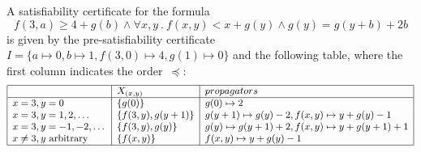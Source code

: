 \documentclass[runningheads]{llncs}
\begin{document}
\begin{example}\label{ex:certificate-example}
A satisfiability certificate for the formula \[f(3, a) \geq 4 + g(b) \wedge \forall x, y \:.\: f(x, y) < x + g(y) \wedge g(y) = g(y+b) + 2b\] is 
given by the pre-satisfiability certificate $I = \{ a \mapsto 0, b \mapsto 1, f(3,0) \mapsto 4, g(1) \mapsto 0 \}$ and the following table, where the first column indicates the order~$\preceq$:
    \[\small
    \begin{array}{|l|l|l|l|}\hline
      & X_{(x,y)} & propagators\\ \hline
        x=3, y=0  & \{g(0)\} & g(0)\mapsto 2\\
        x=3,y=1,2,\dots & \{f(3,y), g(y+1)\} & g(y+1)\mapsto g(y)-2, f(x,y)\mapsto y+g(y)-1\\
        x=3, y=-1,-2,\dots &  \{f(3,y), g(y)\} & g(y)\mapsto g(y+1)+2, f(x,y)\mapsto y+g(y+1)+1 \\
       x\neq 3, y \text{ arbitrary}  &   \{f(x,y) \} & f(x,y)\mapsto y+g(y)-1\\ \hline
    \end{array}
  \]
\end{example}
\end{document}
